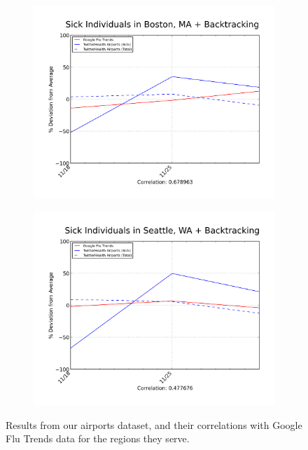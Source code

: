 \documentclass[11pt, letterpaper]{article}
\begin{document}
\begin{figure}[t!]
\begin{center}
\begin{subfigure}[t]{0.45\textwidth}
                    \end{subfigure}
                    \begin{subfigure}[b]{0.45\textwidth}
                        \includegraphics[width=\textwidth]{../plot/figures/BOS_idev_2012-12-17.png}
                    \end{subfigure}
                    \begin{subfigure}[b]{0.45\textwidth}
                        \includegraphics[width=\textwidth]{../plot/figures/SEA_idev_2012-12-16.png}
                    \end{subfigure}
                    \caption{Results from our airports dataset, and their correlations with Google Flu Trends data for the regions they serve.}
                    \label{backtrack-comparison}
                \end{center}
            \end{figure}
\end{document}
